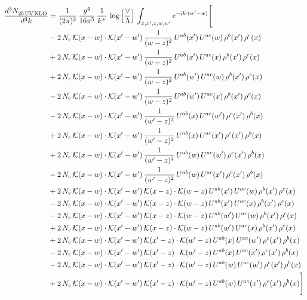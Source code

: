 \documentclass[9pt]{article}
\numberwithin{equation}{section}
\begin{document}
\begin{align}
\frac{d^{3}N_{2b\,\rm UV\, NLO}^{\rm}}{d^{3}k} & = \frac{1}{(2\pi)^{3}}\,\frac{g^{4}}{16\pi^{5}}\,\frac{1}{k^{+}}\,\log{\left[\frac{\vee}{\Lambda}\right]}\,\int_{x,x',z,w,w'}e^{-ik\cdot(w'-w)}\Bigg[\notag\\ & -2\,N_{c}\,\mathcal{K}(x-w)\cdot\mathcal{K}(x'-w')\,\frac{1}{(w-z)^{2}}\,U^{ab}(x')\,U^{ac}(w)\,\rho^{b}(x')\,\rho^{c}(x)\notag\\
&+2\,N_{c}\,\mathcal{K}(x-w)\cdot\mathcal{K}(x'-w')\,\frac{1}{(w-z)^{2}}\,U^{ab}(x')\,U^{ac}(x)\,\rho^{b}(x')\,\rho^{c}(x)\notag\\
&+2\,N_{c}\,\mathcal{K}(x-w)\cdot\mathcal{K}(x'-w')\,\frac{1}{(w-z)^{2}}\,U^{ab}(w')\,U^{ac}(w)\,\rho^{b}(x')\,\rho^{c}(x)\notag\\
&-2\,N_{c}\,\mathcal{K}(x-w)\cdot\mathcal{K}(x'-w')\,\frac{1}{(w-z)^{2}}\,U^{ab}(w')\,U^{ac}(x)\,\rho^{b}(x')\,\rho^{c}(x)\notag\\
&-2\,N_{c}\,\mathcal{K}(x-w)\cdot\mathcal{K}(x'-w')\,\frac{1}{(w'-z)^{2}}\,U^{ab}(x)\,U^{ac}(w')\,\rho^{c}(x')\,\rho^{b}(x)\notag\\
&+2\,N_{c}\,\mathcal{K}(x-w)\cdot\mathcal{K}(x'-w')\,\frac{1}{(w'-z)^{2}}\,U^{ab}(x)\,U^{ac}(x')\,\rho^{c}(x')\,\rho^{b}(x)\notag\\
&+2\,N_{c}\,\mathcal{K}(x-w)\cdot\mathcal{K}(x'-w')\,\frac{1}{(w'-z)^{2}}\,U^{ab}(w)\,U^{ac}(w')\,\rho^{c}(x')\,\rho^{b}(x)\notag\\
&-2\,N_{c}\,\mathcal{K}(x-w)\cdot\mathcal{K}(x'-w')\,\frac{1}{(w'-z)^{2}}\,U^{ab}(w)\,U^{ac}(x')\,\rho^{c}(x')\,\rho^{b}(x)\notag\\
&+2\,N_{c}\,\mathcal{K}(x-w)\cdot\mathcal{K}(x'-w')\,\mathcal{K}(x-z)\cdot\mathcal{K}(w-z)\,U^{ab}(x')\,U^{ac}(w)\,\rho^{b}(x')\,\rho^{c}(x)\notag\\
&-2\,N_{c}\,\mathcal{K}(x-w)\cdot\mathcal{K}(x'-w')\,\mathcal{K}(x-z)\cdot\mathcal{K}(w-z)\,U^{ab}(x')\,U^{ac}(x)\,\rho^{b}(x')\,\rho^{c}(x)\notag\\
&-2\,N_{c}\,\mathcal{K}(x-w)\cdot\mathcal{K}(x'-w')\,\mathcal{K}(x-z)\cdot\mathcal{K}(w-z)\,U^{ab}(w')\,U^{ac}(w)\,\rho^{b}(x')\,\rho^{c}(x)\notag\\
&+2\,N_{c}\,\mathcal{K}(x-w)\cdot\mathcal{K}(x'-w')\,\mathcal{K}(x-z)\cdot\mathcal{K}(w-z)\,U^{ab}(w')\,U^{ac}(x)\,\rho^{b}(x')\,\rho^{c}(x)\notag\\
&+2\,N_{c}\,\mathcal{K}(x-w)\cdot\mathcal{K}(x'-w')\,\mathcal{K}(x'-z)\cdot\mathcal{K}(w'-z)\,U^{ab}(x)\,U^{ac}(w')\,\rho^{c}(x')\,\rho^{b}(x)\notag\\
&-2\,N_{c}\,\mathcal{K}(x-w)\cdot\mathcal{K}(x'-w')\,\mathcal{K}(x'-z)\cdot\mathcal{K}(w'-z)\,U^{ab}(x)\,U^{ac}(x')\,\rho^{c}(x')\,\rho^{b}(x)\notag\\
&-2\,N_{c}\,\mathcal{K}(x-w)\cdot\mathcal{K}(x'-w')\,\mathcal{K}(x'-z)\cdot\mathcal{K}(w'-z)\,U^{ab}(w)\,U^{ac}(w')\,\rho^{c}(x')\,\rho^{b}(x)\notag\\
&+2\,N_{c}\,\mathcal{K}(x-w)\cdot\mathcal{K}(x'-w')\,\mathcal{K}(x'-z)\cdot\mathcal{K}(w'-z)\,U^{ab}(w)\,U^{ac}(x')\,\rho^{c}(x')\,\rho^{b}(x)\Bigg]
\end{align}
\end{document}
